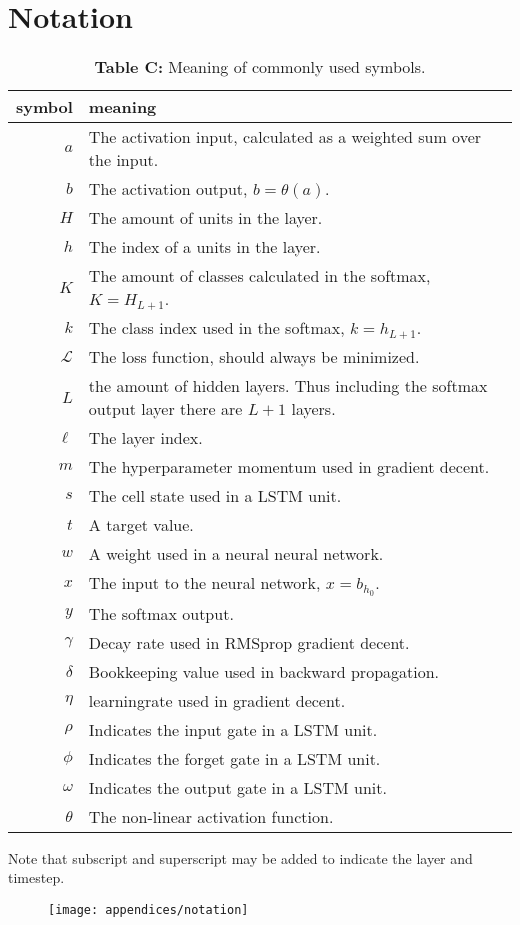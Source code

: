 \chapter{Notation}

\begin{table}[H]
\centering
\begin{tabular}{r p{10cm}}
	symbol & meaning \\ \hline
	$a$ & The activation input, calculated as a weighted sum over the input. \\
	$b$ & The activation output, $b = \theta(a)$. \\
	$H$ & The amount of units in the layer.\\
	$h$ & The index of a units in the layer. \\
	$K$ & The amount of classes calculated in the softmax, $K = H_{L+1}$. \\ 
	$k$ & The class index used in the softmax, $k = h_{L + 1}$.  \\
	$\mathcal{L}$ & The loss function, should always be minimized. \\
	$L$ & the amount of hidden layers. Thus including the softmax output layer there are $L+1$ layers. \\
	$\ell$ & The layer index. \\
	$m$ & The hyperparameter momentum used in gradient decent. \\
	$s$ & The cell state used in a LSTM unit. \\
	$t$ & A target value. \\
	$w$ & A weight used in a neural neural network. \\
	$x$ & The input to the neural network, $x = b_{h_0}$. \\
	$y$ & The softmax output. \\
	$\gamma$ & Decay rate used in RMSprop gradient decent. \\
	$\delta$ & Bookkeeping value used in backward propagation. \\
	$\eta$ & learningrate used in gradient decent. \\
	$\rho$ & Indicates the input gate in a LSTM unit. \\ 
	$\phi$ & Indicates the forget gate in a LSTM unit. \\ 
	$\omega$ & Indicates the output gate in a LSTM unit. \\ 
	$\theta$ & The non-linear activation function.
\end{tabular}
\caption*{\textbf{Table C:} Meaning of commonly used symbols.}
\end{table}

\vspace{-0.1cm}
Note that subscript and superscript may be added to indicate the layer and timestep.
\begin{figure}[H]
	\vspace{-0.2cm}
	\centering
	\texttt{[image: appendices/notation]}
\end{figure}
